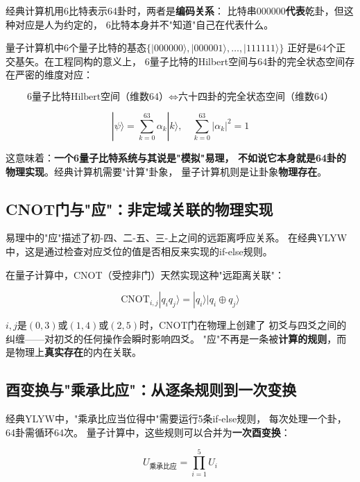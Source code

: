 \documentclass[twocolumn]{article}
\begin{document}
经典计算机用6比特表示64卦时，两者是\textbf{编码关系}：
比特串000000\textbf{代表}乾卦，但这种对应是人为约定的，
6比特本身并不"知道"自己在代表什么。

量子计算机中6个量子比特的基态$\{|000000\rangle, |000001\rangle, \ldots, |111111\rangle\}$
正好是64个正交基矢。在工程同构的意义上，
6量子比特的Hilbert空间与64卦的完全状态空间存在严密的维度对应：

\begin{equation}
    \text{6量子比特Hilbert空间（维数64）}
    \Longleftrightarrow
    \text{六十四卦的完全状态空间（维数64）}
\end{equation}

\begin{equation}
    |\psi\rangle = \sum_{k=0}^{63} \alpha_k |k\rangle,\quad
    \sum_{k=0}^{63} |\alpha_k|^2 = 1
\end{equation}

\noindent 这意味着：\textbf{一个6量子比特系统与其说是"模拟"易理，
不如说它本身就是64卦的物理实现}。经典计算机需要"计算"卦象，
量子计算机则是让卦象\textbf{物理存在}。

\subsection{CNOT门与"应"：非定域关联的物理实现}

易理中的"应"描述了初-四、二-五、三-上之间的远距离呼应关系。
在经典YLYW中，这是通过检查对应爻位的值是否相反来实现的if-else规则。

在量子计算中，CNOT（受控非门）天然实现这种"远距离关联"：

\begin{equation}
    \text{CNOT}_{i,j} |q_i q_j\rangle = |q_i\rangle |q_i \oplus q_j\rangle
\end{equation}

\noindent ${i,j}$是$(0,3)$或$(1,4)$或$(2,5)$时，CNOT门在物理上创建了
初爻与四爻之间的纠缠——对初爻的任何操作会瞬时影响四爻。
"应"不再是一条被\textbf{计算的规则}，而是物理上\textbf{真实存在}的内在关联。

\subsection{酉变换与"乘承比应"：从逐条规则到一次变换}

经典YLYW中，"乘承比应当位得中"需要运行5条if-else规则，
每次处理一个卦，64卦需循环64次。
量子计算中，这些规则可以合并为\textbf{一次酉变换}：

\begin{equation}
    U_{\text{乘承比应}} = \prod_{i=1}^{5} U_i
\end{equation}
\end{document}
